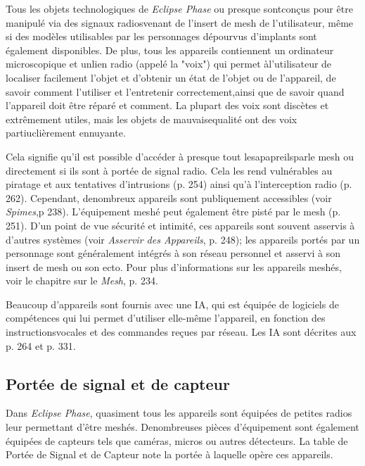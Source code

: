 Tous les objets technologiques de \emph{Eclipse Phase} ou presque sontconçus pour être manipulé via des signaux radiosvenant de l'insert de mesh de l'utilisateur, même si des modèles utilisables par les personnages dépourvus d'implants sont également disponibles. De plus, tous les appareils contiennent un ordinateur microscopique et unlien radio (appelé la "voix") qui permet àl'utilisateur de localiser facilement l'objet et d'obtenir un état de l'objet ou de l'appareil, de savoir comment l'utiliser et l'entretenir correctement,ainsi que de savoir quand l'appareil doit être réparé et comment. La plupart des voix sont discètes et extrêmement utiles, mais les objets de mauvaisequalité ont des voix partiuclièrement ennuyante. 

Cela signifie qu'il est possible d'accéder à presque tout lesapapreilsparle mesh ou directement si ils sont à portée de signal radio. Cela les rend vulnérables au piratage et aux tentatives d'intrusions (p. 254) ainsi qu'à l'interception radio (p. 262). Cependant, denombreux appareils sont publiquement accessibles (voir \emph{Spimes},p 238). L'équipement meshé peut également être pisté par le mesh (p. 251). D'un point de vue sécurité et intimité, ces appareils sont souvent asservis à d'autres systèmes (voir \emph{Asservir des Appareils}, p. 248); les appareils portés par un personnage sont généralement intégrés à son réseau personnel et asservi à son insert de mesh ou son ecto. Pour plus d'informations sur les appareils meshés, voir le chapitre sur le \emph{Mesh}, p. 234. 

Beaucoup d'appareils sont fournis avec une IA, qui est équipée de logiciels de compétences qui lui permet d'utiliser elle-même l'appareil, en fonction des instructionsvocales et des commandes reçues par réseau. Les IA sont décrites aux p. 264 et p. 331. 



\subsection{Portée de signal et de capteur} \label{sec:radio-sensor-ranges} 

Dans \emph{Eclipse Phase}, quasiment tous les appareils sont équipées de petites radios leur permettant d'être meshés. Denombreuses pièces d'équipement sont également équipées de capteurs tels que caméras, micros ou autres détecteurs. La table de Portée de Signal et de Capteur note la portée à laquelle opère ces appareils. 

